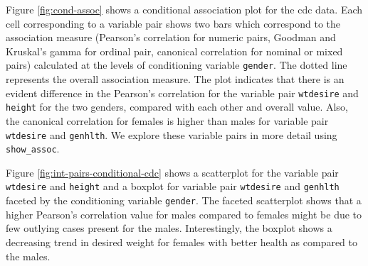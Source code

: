 Figure \ref{fig:cond-assoc} shows a conditional association plot for the
cdc data. Each cell corresponding to a variable pair shows two bars
which correspond to the association measure (Pearson's correlation for
numeric pairs, Goodman and Kruskal's gamma for ordinal pair, canonical
correlation for nominal or mixed pairs) calculated at the levels of
conditioning variable \texttt{gender}. The dotted line represents the
overall association measure. The plot indicates that there is an evident
difference in the Pearson's correlation for the variable pair
\texttt{wtdesire} and \texttt{height} for the two genders, compared with
each other and overall value. Also, the canonical correlation for
females is higher than males for variable pair \texttt{wtdesire} and
\texttt{genhlth}. We explore these variable pairs in more detail using
\texttt{show\_assoc}.

Figure \ref{fig:int-pairs-conditional-cdc} shows a scatterplot for the
variable pair \texttt{wtdesire} and \texttt{height} and a boxplot for
variable pair \texttt{wtdesire} and \texttt{genhlth} faceted by the
conditioning variable \texttt{gender}. The faceted scatterplot shows
that a higher Pearson's correlation value for males compared to females
might be due to few outlying cases present for the males. Interestingly,
the boxplot shows a decreasing trend in desired weight for females with
better health as compared to the males.

